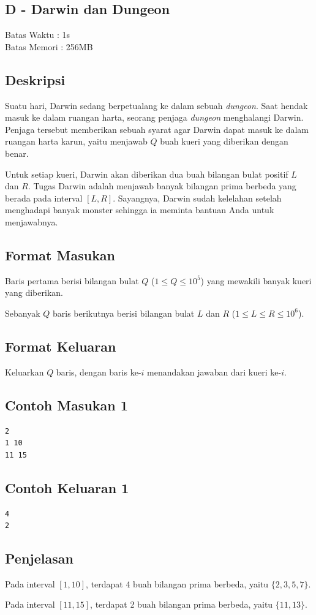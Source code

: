 \documentclass{article}
\begin{document}
\begin{center}
    \section*{D - Darwin dan Dungeon} %
    Batas Waktu : 1s \\  %
    Batas Memori :  256MB \\ %
\end{center}

\subsection*{Deskripsi}

Suatu hari, Darwin sedang berpetualang ke dalam sebuah \textit{dungeon}. Saat hendak masuk ke dalam ruangan harta, seorang penjaga \textit{dungeon} menghalangi Darwin. Penjaga tersebut memberikan sebuah syarat agar Darwin dapat masuk ke dalam ruangan harta karun, yaitu menjawab $Q$ buah kueri yang diberikan dengan benar. 

Untuk setiap kueri, Darwin akan diberikan dua buah bilangan bulat positif $L$ dan $R$. Tugas Darwin adalah menjawab banyak bilangan prima berbeda yang berada pada interval $[L, R]$. Sayangnya, Darwin sudah kelelahan setelah menghadapi banyak monster sehingga ia meminta bantuan Anda untuk menjawabnya.

\subsection*{Format Masukan}
Baris pertama berisi bilangan bulat $Q$ ($1 \leq Q \leq  10^5 $) yang mewakili banyak kueri yang diberikan.

Sebanyak $Q$ baris berikutnya berisi bilangan bulat $L$ dan $R$ ($ 1 \le L \le R \le 10^{6} $).

\subsection*{Format Keluaran}

Keluarkan $Q$ baris, dengan baris ke-$i$ menandakan jawaban dari kueri ke-$i$.

\begin{multicols}{2}
\subsection*{Contoh Masukan 1}
\begin{lstlisting}
2
1 10
11 15
\end{lstlisting}
\columnbreak
\subsection*{Contoh Keluaran 1}
\begin{lstlisting}
4
2
\end{lstlisting}
\vfill
\null
\end{multicols}


\subsection*{Penjelasan}

Pada interval $[1, 10]$, terdapat 4 buah bilangan prima berbeda, yaitu $\{2, 3, 5, 7\}$.

Pada interval $[11, 15]$, terdapat 2 buah bilangan prima berbeda, yaitu $\{11, 13\}$.
\end{document}
